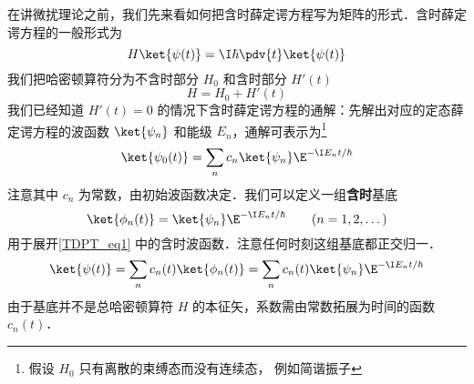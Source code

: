 

在讲微扰理论之前，我们先来看如何把含时薛定谔方程写为矩阵的形式．含时薛定谔方程的一般形式为
\begin{equation}\label{TDPT_eq1}
H \ket{\psi(t)} = \I\hbar \pdv{t} \ket{\psi(t)}
\end{equation}
我们把哈密顿算符分为不含时部分 $H_0$ 和含时部分 $H'(t)$
\begin{equation}
H = H_0 + H'(t)
\end{equation}
我们已经知道 %
$H'(t) = 0$ 的情况下含时薛定谔方程的通解：先解出对应的定态薛定谔方程的波函数 $\ket{\psi_n}$ 和能级 $E_n$，通解可表示为\footnote{假设 $H_0$ 只有离散的束缚态而没有连续态， 例如简谐振子}
\begin{equation}
\ket{\psi_0(t)} = \sum_n c_n \ket{\psi_n} \E^{-\I E_n t/\hbar}
\end{equation}
注意其中 $c_n$ 为常数，由初始波函数决定．我们可以定义一组\textbf{含时}基底
\begin{equation}
\ket{\phi_n(t)} = \ket{\psi_n} \E^{-\I E_n t/\hbar} \qquad (n = 1, 2, \dots)
\end{equation}
用于展开\autoref{TDPT_eq1} 中的含时波函数．注意任何时刻这组基底都正交归一．
\begin{equation}
\ket{\psi(t)} = \sum_n c_n(t) \ket{\phi_n(t)} = \sum_n c_n(t) \ket{\psi_n} \E^{-\I E_n t/\hbar}
\end{equation}
由于基底并不是总哈密顿算符 $H$ 的本征矢，系数需由常数拓展为时间的函数 $c_n(t)$．

